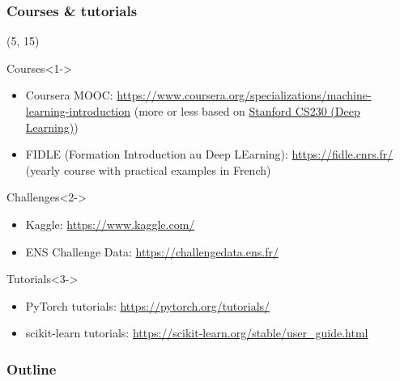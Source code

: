 \documentclass[10pt]{beamer}
\begin{document}
\begin{frame}
  \frametitle{Courses \& tutorials}

  \begin{textblock}{90}(5, 15)
    \begin{block}{Courses}<1->
      \begin{itemize}
      \item Coursera MOOC:
        \url{https://www.coursera.org/specializations/machine-learning-introduction} (more or less based on \href{https://cs230.stanford.edu/}{Stanford CS230 (Deep Learning)})
      \item FIDLE (Formation Introduction au Deep LEarning): \url{https://fidle.cnrs.fr/}
        (yearly course with practical examples in French)
      \end{itemize}
    \end{block}

    \begin{block}{Challenges}<2->
      \begin{itemize}
      \item Kaggle: \url{https://www.kaggle.com/}
      \item ENS Challenge Data: \url{https://challengedata.ens.fr/}
      \end{itemize}
    \end{block}

    \begin{block}{Tutorials}<3->
      \begin{itemize}
      \item PyTorch tutorials: \url{https://pytorch.org/tutorials/}
      \item scikit-learn tutorials:
        \url{https://scikit-learn.org/stable/user_guide.html}
      \end{itemize}
    \end{block}
  \end{textblock}
\end{frame}


\begin{frame}
  \frametitle{Outline}
  \tableofcontents[hidesubsections]
\end{frame}






\end{document}
